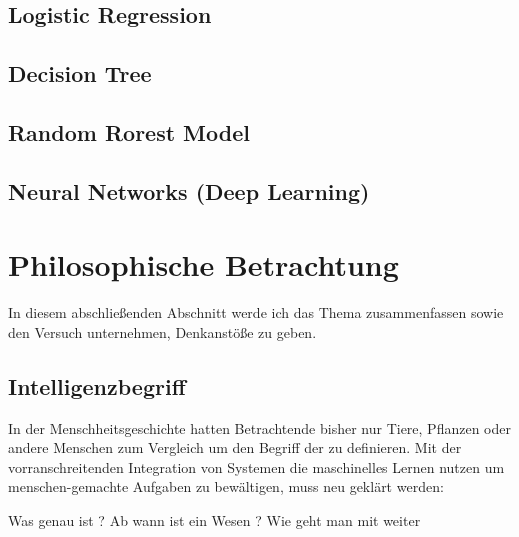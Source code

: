 \documentclass[12pt]{report}
\begin{document}
    \subsection{Logistic Regression}
    \subsection{Decision Tree}
    \subsection{Random Rorest Model}
    \subsection{Neural Networks (Deep Learning)}
    \section{Philosophische Betrachtung}
    In diesem abschließenden Abschnitt werde ich das Thema zusammenfassen sowie den Versuch unternehmen,
    Denkanstöße zu geben.
    \subsection{Intelligenzbegriff}
    In der Menschheitsgeschichte hatten Betrachtende bisher nur Tiere, Pflanzen oder andere Menschen zum Vergleich
    um den Begriff der  zu definieren. Mit der vorranschreitenden Integration von Systemen die maschinelles
    Lernen nutzen um menschen-gemachte Aufgaben zu bewältigen, muss neu geklärt werden:
        \begin{displayquote}
            Was genau ist ?
            Ab wann ist ein Wesen ?
            Wie geht man mit weiter
        \end{displayquote}

    \printbibliography
\end{document}
